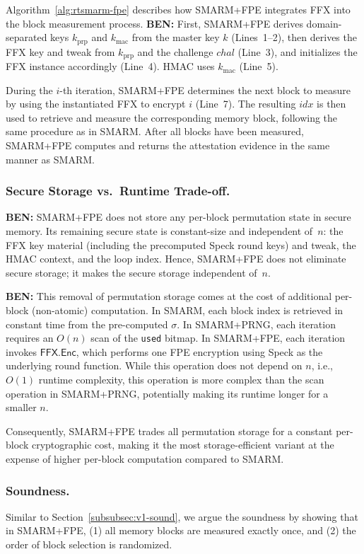 \documentclass{ieeeaccess}
\DeclareRobustCommand{\ben}[1]{{\color{BENcolor}\textbf{BEN:} #1}}
\newcommand{\rtsmarmone}{SMARM+PRNG\xspace}
\newcommand{\rtsmarmtwo}{SMARM+FPE\xspace}
\begin{document}
Algorithm~\ref{alg:rtsmarm-fpe} describes how \rtsmarmtwo integrates FFX into the block measurement process.
\ben{First, \rtsmarmtwo derives domain-separated keys $k_{\mathrm{prp}}$ and $k_{\mathrm{mac}}$ from the master key $k$ (Lines~1--2), then derives the FFX key and tweak from $k_{\mathrm{prp}}$ and the challenge $chal$ (Line~3), and initializes the FFX instance accordingly (Line~4). HMAC uses $k_{\mathrm{mac}}$ (Line~5).}

During the $i$-th iteration, \rtsmarmtwo determines the next block to measure by using the instantiated FFX to encrypt $i$ (Line~7).
The resulting $idx$ is then used to retrieve and measure the corresponding memory block, following the same procedure as in SMARM.
After all blocks have been measured, \rtsmarmtwo computes and returns the attestation evidence in the same manner as SMARM.

\subsubsection{Secure Storage vs.\ Runtime Trade-off.}
\ben{\rtsmarmtwo does not store any per-block permutation state in secure memory.
Its remaining secure state is constant-size and independent of~$n$: the FFX key material (including the precomputed Speck round keys) and tweak, the HMAC context, and the loop index.
Hence, \rtsmarmtwo does not eliminate secure storage; it makes the secure storage independent of~$n$.}


\ben{This removal of permutation storage} comes at the cost 
of additional per-block (non-atomic) computation.
In SMARM, each block index is retrieved in constant time 
from the pre-computed $\sigma$.
In \rtsmarmone, each iteration requires an $O(n)$ scan of 
the \texttt{used} bitmap.
In \rtsmarmtwo, each iteration invokes 
$\mathsf{FFX.Enc}$, which performs one FPE encryption using Speck as the underlying round function. 
While this operation does not depend on $n$, i.e., $O(1)$ runtime complexity, this operation is more complex than the scan operation in \rtsmarmone, potentially making its runtime longer for a smaller $n$.

Consequently, \rtsmarmtwo trades all permutation storage 
for a constant per-block cryptographic cost, making it 
the most storage-efficient variant at the expense of higher per-block computation compared to SMARM.

\subsubsection{Soundness.}
Similar to Section~\ref{subsubsec:v1-sound}, we argue the soundness by showing that in \rtsmarmtwo, (1) all memory blocks are measured exactly once, and (2) the order of block selection is randomized.
\end{document}
